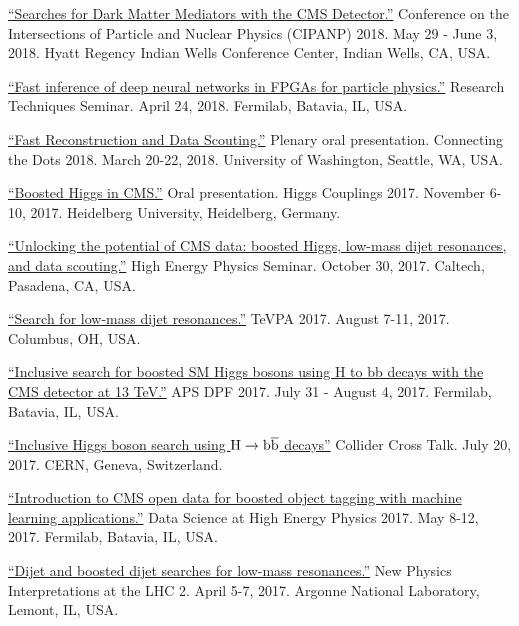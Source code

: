 \documentclass[12pt]{res}
\begin{document}
\begin{resume}
\href{https://conferences.lbl.gov/event/137/session/27/contribution/354}{``Searches
    for Dark Matter Mediators with the CMS Detector.''} Conference on the Intersections of Particle and Nuclear
  Physics (CIPANP) 2018. May 29 - June 3, 2018. Hyatt Regency Indian Wells
  Conference Center, Indian Wells, CA, USA.

\href{https://indico.fnal.gov/event/16908/}{``Fast inference of deep neural networks in FPGAs for particle physics.''} Research Techniques Seminar. April 24, 2018. Fermilab, Batavia, IL, USA.

\href{https://indico.cern.ch/event/658267/contributions/2881127/}{``Fast Reconstruction and Data Scouting.''} Plenary oral
  presentation. Connecting the Dots 2018. March 20-22,
  2018. University of Washington, Seattle, WA, USA.

\href{http://www.thphys.uni-heidelberg.de/~higgs/talks/duarte.pdf}{``Boosted Higgs in CMS.''} Oral
  presentation. Higgs Couplings 2017. November 6-10, 2017. Heidelberg
  University, Heidelberg, Germany.

\href{https://indico.hep.caltech.edu/indico/conferenceDisplay.py?confId=149}{``Unlocking the potential of CMS data: boosted Higgs, low-mass dijet resonances, and data scouting.''} High Energy Physics Seminar. October 30, 2017. Caltech, Pasadena, CA, USA.

\href{https://indico.cern.ch/event/615891/contributions/2666361/}{``Search
    for low-mass dijet resonances.''} TeVPA 2017. August 7-11,
  2017. Columbus, OH, USA.

\href{https://indico.fnal.gov/contributionDisplay.py?sessionId=14&contribId=38&confId=11999}{``Inclusive
  search for boosted SM Higgs bosons using H to bb decays with the CMS
  detector at 13 TeV.''} APS DPF 2017.  July
  31 - August 4, 2017. Fermilab, Batavia, IL, USA.

\href{https://indico.cern.ch/event/649575/}{``Inclusive
    Higgs boson search using $\mathrm{H}\to\mathrm{b}\overline{\mathrm{b}}$ decays''} Collider Cross
  Talk. July 20, 2017. CERN, Geneva, Switzerland.

\href{https://indico.fnal.gov/contributionDisplay.py?sessionId=6&contribId=54&confId=13497}{``Introduction
    to CMS open data for boosted object tagging with machine learning
    applications.''} Data Science at High Energy Physics 2017. May
  8-12, 2017. Fermilab, Batavia, IL, USA.

\href{https://indico.cern.ch/event/540843/contributions/2464658/}{``Dijet
    and boosted dijet searches for low-mass resonances.''} New Physics Interpretations at the LHC 2. April
  5-7, 2017. Argonne National Laboratory, Lemont, IL, USA.


\end{resume}
\end{document}
